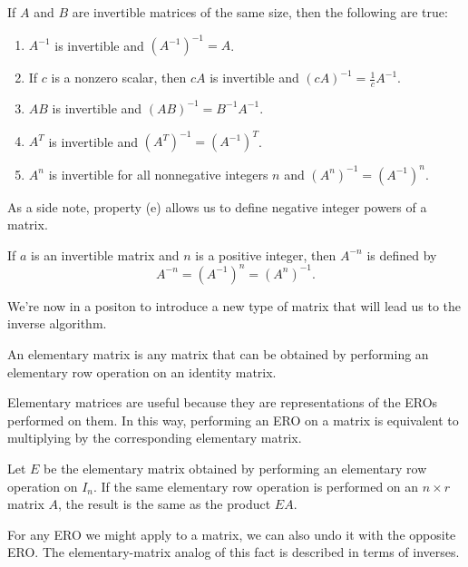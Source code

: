 \documentclass[../m73main.tex]{subfiles}
\begin{document}
\begin{theorem}
	If $A$ and $B$ are invertible matrices of the same size, then the following are true:
	\begin{enumerate}[label=(\alph*)]
		\item $A^{-1}$ is invertible and $(A^{-1})^{-1} = A$.
		\item If $c$ is a nonzero scalar, then $cA$ is invertible and $(cA)^{-1} = \frac{1}{c}A^{-1}$.
		\item $AB$ is invertible and $(AB)^{-1} = B^{-1}A^{-1}$.
		\item $A^T$ is invertible and $(A^T)^{-1} = (A^{-1})^T$.
		\item $A^n$ is invertible for all nonnegative integers $n$ and $(A^n)^{-1} = (A^{-1})^n$.
	\end{enumerate}
\end{theorem}

As a side note, property (e) allows us to define negative integer powers of a matrix.

\begin{definition}
	If $a$ is an invertible matrix and $n$ is a positive integer, then $A^{-n}$ is defined by
	\[ A^{-n} = (A^{-1})^n = (A^n)^{-1}. \]
\end{definition}

We're now in a positon to introduce a new type of matrix that will lead us to the inverse algorithm.

\begin{definition}
	An elementary matrix is any matrix that can be obtained by performing an elementary row operation on an identity matrix.
\end{definition}

Elementary matrices are useful because they are representations of the EROs performed on them.
In this way, performing an ERO on a matrix is equivalent to multiplying by the corresponding elementary matrix.

\begin{theorem}
	Let $E$ be the elementary matrix obtained by performing an elementary row operation on $I_n$.
	If the same elementary row operation is performed on an $n\times r$ matrix $A$, the result is the same as the product $EA$.
\end{theorem}

For any ERO we might apply to a matrix, we can also undo it with the opposite ERO.
The elementary-matrix analog of this fact is described in terms of inverses.
\end{document}
